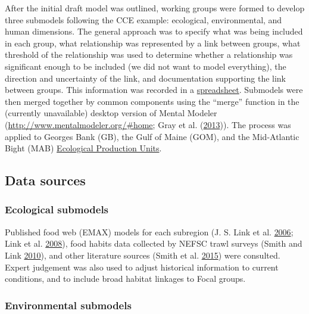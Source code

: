 \documentclass[
]{book}
\begin{document}
After the initial draft model was outlined, working groups were formed to develop three submodels following the CCE example: ecological, environmental, and human dimensions. The general approach was to specify what was being included in each group, what relationship was represented by a link between groups, what threshold of the relationship was used to determine whether a relationship was significant enough to be included (we did not want to model everything), the direction and uncertainty of the link, and documentation supporting the link between groups. This information was recorded in a \href{https://comet.nefsc.noaa.gov/erddap/tabledap/concept_model_2018.html}{spreadsheet}. Submodels were then merged together by common components using the ``merge'' function in the (currently unavailable) desktop version of Mental Modeler (\url{http://www.mentalmodeler.org/\#home}; Gray et al. (\protect\hyperlink{ref-gray_mental_2013}{2013})). The process was applied to Georges Bank (GB), the Gulf of Maine (GOM), and the Mid-Atlantic Bight (MAB) \protect\hyperlink{epu}{Ecological Production Units}.

\hypertarget{data-sources-12}{%
\subsection{Data sources}\label{data-sources-12}}

\hypertarget{ecological-submodels}{%
\subsubsection{Ecological submodels}\label{ecological-submodels}}

Published food web (EMAX) models for each subregion (J. S. Link et al. \protect\hyperlink{ref-link_documentation_2006}{2006}; Link et al. \protect\hyperlink{ref-link_northeast_2008}{2008}), food habits data collected by NEFSC trawl surveys (Smith and Link \protect\hyperlink{ref-smith_trophic_2010}{2010}), and other literature sources (Smith et al. \protect\hyperlink{ref-smith_consumption_2015}{2015}) were consulted. Expert judgement was also used to adjust historical information to current conditions, and to include broad habitat linkages to Focal groups.

\hypertarget{environmental-submodels}{%
\subsubsection{Environmental submodels}\label{environmental-submodels}}
\end{document}
